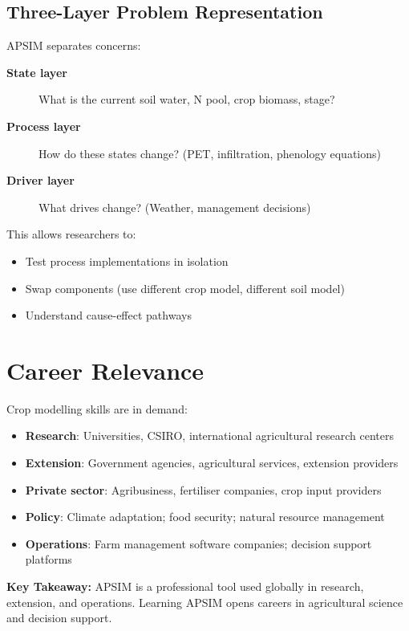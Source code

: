 \subsection{Three-Layer Problem Representation}

APSIM separates concerns:

\begin{description}
  \item[\textbf{State layer}] What is the current soil water, N pool, crop biomass, stage?
  \item[\textbf{Process layer}] How do these states change? (PET, infiltration, phenology equations)
  \item[\textbf{Driver layer}] What drives change? (Weather, management decisions)
\end{description}

This allows researchers to:
\begin{itemize}
  \item Test process implementations in isolation
  \item Swap components (use different crop model, different soil model)
  \item Understand cause-effect pathways
\end{itemize}

\section{Career Relevance}

Crop modelling skills are in demand:

\begin{itemize}
  \item \textbf{Research}: Universities, CSIRO, international agricultural research centers
  \item \textbf{Extension}: Government agencies, agricultural services, extension providers
  \item \textbf{Private sector}: Agribusiness, fertiliser companies, crop input providers
  \item \textbf{Policy}: Climate adaptation; food security; natural resource management
  \item \textbf{Operations}: Farm management software companies; decision support platforms
\end{itemize}

\begin{keyconceptbox}
\textbf{Key Takeaway:} APSIM is a professional tool used globally in research, extension, and operations. Learning APSIM opens careers in agricultural science and decision support.
\end{keyconceptbox}

